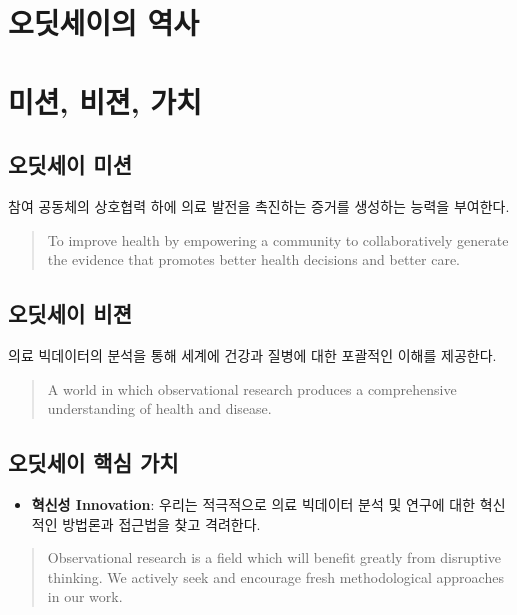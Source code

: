 \documentclass[]{book}
\providecommand{\tightlist}{%
  \setlength{\itemsep}{0pt}\setlength{\parskip}{0pt}}
\begin{document}
\section{오딧세이의 역사}\label{OHDSIHistory}

\section{미션, 비젼, 가치}\label{MissionVissionValues}

\subsection{오딧세이 미션}\label{-}

참여 공동체의 상호협력 하에 의료 발전을 촉진하는 증거를 생성하는 능력을
부여한다.

\begin{quote}
To improve health by empowering a community to collaboratively generate
the evidence that promotes better health decisions and better care.
\end{quote}

\subsection{오딧세이 비젼}\label{-}

의료 빅데이터의 분석을 통해 세계에 건강과 질병에 대한 포괄적인 이해를
제공한다.

\begin{quote}
A world in which observational research produces a comprehensive
understanding of health and disease.
\end{quote}

\subsection{오딧세이 핵심 가치}\label{--}

\begin{itemize}
\tightlist
\item
  \textbf{혁신성 Innovation}: 우리는 적극적으로 의료 빅데이터 분석 및
  연구에 대한 혁신적인 방법론과 접근법을 찾고 격려한다.
\end{itemize}

\begin{quote}
Observational research is a field which will benefit greatly from
disruptive thinking. We actively seek and encourage fresh methodological
approaches in our work.
\end{quote}
\end{document}
